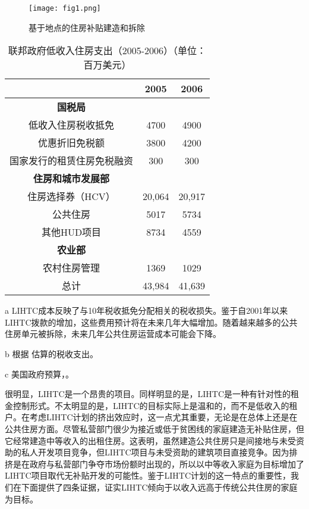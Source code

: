 \documentclass[lang=cn,11pt,a4paper]{paper}
\begin{document}
\begin{figure}[h]
	\centering
	\texttt{[image: fig1.png]}
	\caption{基于地点的住房补贴建造和拆除}\label{fig1}
\end{figure}


\begin{table}[h]
  \centering
  \setlength{\tabcolsep}{12mm}
    \begin{threeparttable}
    \caption{联邦政府低收入住房支出（2005-2006）（单位：百万美元）\!\!}\label{tab2}
      \begin{tabular}{ccc}
        \toprule
        & 2005 & 2006 \\
        \midrule
        \textbf{国税局}\tnote{b} & & \\
        低收入住房税收抵免 & 4700 & 4900 \\
        优惠折旧免税额 & 3800 & 4200 \\
        国家发行的租赁住房免税融资 & 300 &
        300 \\[5pt]
        \textbf{住房和城市发展部}\tnote{c} & & \\
        住房选择券（HCV） & 20,064 & 20,917 \\
        公共住房 & 5017 & 5734 \\
        其他HUD项目 & 8734 & 4559 \\[5pt]
        \textbf{农业部}\tnote{c} & & \\
        农村住房管理 & 1369 & 1029 \\
        总计 & 43,984 & 41,639 \\
        \bottomrule
      \end{tabular}
    \begin{tablenotes}
      \footnotesize
      \item[a] LIHTC成本反映了与10年税收抵免分配相关的税收损失。鉴于自2001年以来LIHTC拨款的增加，这些费用预计将在未来几年大幅增加。随着越来越多的公共住房单元被拆除，未来几年公共住房运营成本可能会下降。
      \item[b] 根据 \cite{USCongress2005} 估算的税收支出。
      \item[c] 美国政府预算，\cite{Budget2006}。
    \end{tablenotes}
  \end{threeparttable}
  \end{table}


很明显，LIHTC是一个昂贵的项目。同样明显的是，LIHTC是一种有针对性的租金控制形式。不太明显的是，LIHTC的目标实际上是温和的，而不是低收入的租户。在考虑LIHTC计划的挤出效应时，这一点尤其重要，无论是在总体上还是在公共住房方面。尽管私营部门很少为接近或低于贫困线的家庭建造无补贴住房，但它经常建造中等收入的出租住房。这表明，虽然建造公共住房只是间接地与未受资助的私人开发项目竞争，但LIHTC项目与未受资助的建筑项目直接竞争。因为排挤是在政府与私营部门争夺市场份额时出现的，所以以中等收入家庭为目标增加了LIHTC项目取代无补贴开发的可能性。鉴于LIHTC计划的这一特点的重要性，我们在下面提供了四条证据，证实LIHTC倾向于以收入远高于传统公共住房的家庭为目标。
\end{document}
